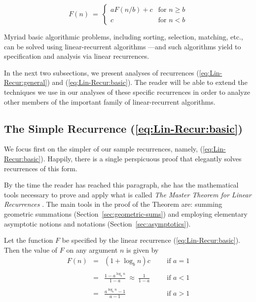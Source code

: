 \begin{equation}
\label{eq:Lin-Recur:basic}
F(n) \ = \ \left\{
\begin{array}{cl}
a F(n/b) + c & \mbox{for } n \geq b \\
c & \mbox{for } n < b
\end{array}
\right.
\end{equation}

Myriad basic algorithmic problems, including sorting, selection,
matching, etc., can be solved using linear-recurrent algorithms
\cite{CLRS}---and such algorithms yield to specification and analysis
via linear recurrences.

In the next two subsections, we present analyses of recurrences
(\ref{eq:Lin-Recur:general}) and (\ref{eq:Lin-Recur:basic}).  The
reader will be able to extend the techniques we use in our analyses of
these specific recurrences in order to analyze other members of the
important family of linear-recurrent algorithms.


\subsection{The Simple Recurrence (\ref{eq:Lin-Recur:basic})} 
\label{sec:masterTheorem}
\label{sec:linear-recurrence-basic}

We focus first on the simpler of our sample recurrences, namely,
(\ref{eq:Lin-Recur:basic}).  Happily, there is a single perspicuous
proof that elegantly solves recurrences of this form.

By the time the reader has reached this paragraph, she has the
mathematical tools necessary to prove and apply what is called {\it
  The Master Theorem for Linear Recurrences} \cite{CLRS}.  The main
tools in the proof of the Theorem are: summing geometric summations
(Section~\ref{sec:geometric-sums}) and employing elementary asymptotic
notions and notations (Section~\ref{sec:asymptotics}).

\begin{theorem}
\label{thm:master-thm}
Let the function $F$ be specified by the linear recurrence
(\ref{eq:Lin-Recur:basic}).  Then the value of $F$ on any argument $n$
is given by
\begin{equation}
\label{eq:Lin-Recur:solve}
\begin{array}{lcllll}
F(n) & = & (1 + \log_b n)c &  &  & \mbox{if } a=1 \\
     &   &                 &  &  & \\
     & = &
  {\displaystyle
  \frac{1-a^{\log_b n}}{1-a} \ \approx \ \frac{1}{1-a}
  }
                           &  &  & \mbox{if } a<1 \\
    &   &                  &  &  & \\
    & = &
  {\displaystyle
\frac{a^{\log_b n} -1}{a-1}
  }
                           &  &  & \mbox{if } a>1
\end{array}
\end{equation}
\end{theorem}

